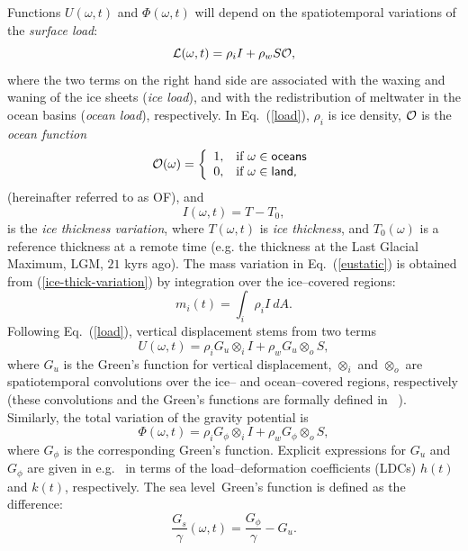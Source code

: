 \documentclass[11pt,fleqn,a4paper,titlepage]{article}
\newcommand\sealevel{sea level~}
\begin{document}
Functions $U(\omega,t)$ and $\Phi(\omega,t)$ will depend on the spatiotemporal variations of the 
\emph{surface load}:  
\begin{equation}\label{load}
{\cal L}(\omega,t) = \rho_{i}I + \rho_{w} S {\cal O},
\end{equation}
where the two terms on the right hand side are associated with the waxing and waning of the ice sheets 
(\textit{ice load}), and with the redistribution of meltwater in the ocean basins (\textit{ocean load}), 
respectively. 
In Eq.~(\ref{load}), $\rho_i$ is ice density, ${\cal O}$ is the \emph{ocean function}   
\begin{equation}\label{eq:ocean-function}
{\cal O}(\omega) = \left\{ \begin{array}{ll} 
1, & \textrm{if~} \omega \in \textsf{oceans}\\ 
0, & \textrm{if~} \omega \in \textsf{land,} 
\end{array} \right. 
\end{equation} 
(hereinafter referred to as OF), and   
\begin{equation}\label{ice-thick-variation}
I(\omega,t)= T - T_0, 
\end{equation}
is the \emph{ice thickness variation}, where $T(\omega,t)$ is \emph{ice thickness}, and $T_{0}(\omega)$ is a reference 
thickness at a remote time ({e.g.} the thickness at the Last Glacial Maximum, LGM, $21$ kyrs ago). The mass variation in 
Eq.~(\ref{eustatic}) is obtained from (\ref{ice-thick-variation}) by integration over the 
ice--covered regions: 
\begin{equation}\label{mass-variation}
m_{i} (t)= \int_{i} \rho_{i}I ~dA.  
\end{equation}
Following Eq.~(\ref{load}), vertical displacement stems from two terms
\begin{equation}\label{u_sle}
{U}(\omega, t) = \rho_i G_{u}\otimes_i I + \rho_w G_{u}\otimes_o S,  
\end{equation}
where $G_{u}$ is the {Green's} function for vertical displacement, 
$\otimes_i$ and $\otimes_o$ are spatiotemporal convolutions 
over the ice-- and ocean--covered regions, respectively (these convolutions and the Green's functions 
are formally defined in \citeauthor{Spada_and_Stocchi_2006}~\citeyear{Spada_and_Stocchi_2006}). Similarly, the total
variation of the gravity potential is
\begin{equation}\label{phi_sle}
\Phi(\omega,t) = \rho_i G_{\phi}\otimes_i I + \rho_w G_{\phi}\otimes_o S,  
\end{equation}
where $G_{\phi}$ is the corresponding {Green's} function. Explicit expressions for $G_u$ and $G_{\phi}$ are given in e.g.~\citet{Spada_and_Stocchi_2006} in terms of the load--deformation coefficients (LDCs) $h(t)$ and $k(t)$, respectively. The \sealevel Green's function is defined as the difference:  
\begin{equation}\label{gf_sl}
\frac{G_{s}}{\gamma}(\omega,t) =    \frac{G_{\phi}}{\gamma} - {G_{u}}. 
\end{equation}
\end{document}
